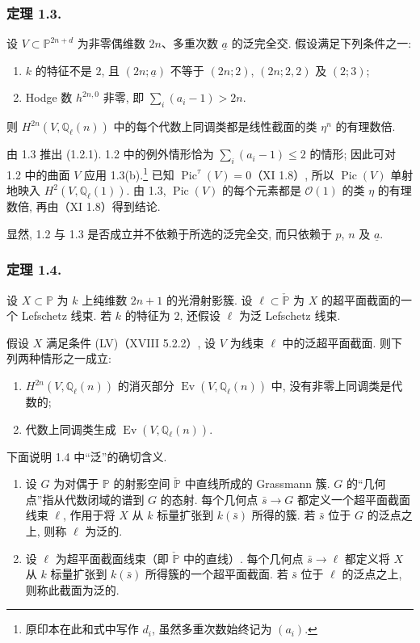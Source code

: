 \subsubsection*{定理 1.3.}
设 $V\subset\mathbb P^{2n+d}$ 为非零偶维数 $2n$、多重次数 $\underline a$ 的泛完全交. 假设满足下列条件之一:
\begin{enumerate}[label=(\alph*)]
\item $k$ 的特征不是 $2$, 且 $(2n;\underline a)$ 不等于 $(2n;2)$, $(2n;2,2)$ 及 $(2;3)$;
\item Hodge 数 $h^{2n,0}$ 非零, 即 $\sum_i(a_i-1)>2n$.
\end{enumerate}
则 $H^{2n}(V,\mathbb Q_\ell(n))$ 中的每个代数上同调类都是线性截面的类 $\eta^n$ 的有理数倍.

由 1.3 推出 (1.2.1). 1.2 中的例外情形恰为 $\sum_i(a_i-1)\leq2$ 的情形; 因此可对 1.2 中的曲面 $V$ 应用 1.3(b).\footnote{原印本在此和式中写作 $d_i$, 虽然多重次数始终记为 $(a_i)$.} 已知 $\operatorname{Pic}^{\tau}(V)=0$（XI 1.8）, 所以 $\operatorname{Pic}(V)$ 单射地映入 $H^2(V,\mathbb Q_\ell(1))$. 由 1.3, $\operatorname{Pic}(V)$ 的每个元素都是 $\mathcal O(1)$ 的类 $\eta$ 的有理数倍, 再由（XI 1.8）得到结论.

显然, 1.2 与 1.3 是否成立并不依赖于所选的泛完全交, 而只依赖于 $p$, $n$ 及 $\underline a$.

\subsubsection*{定理 1.4.}
设 $X\subset\mathbb P$ 为 $k$ 上纯维数 $2n+1$ 的光滑射影簇. 设 $\ell\subset\check{\mathbb P}$ 为 $X$ 的超平面截面的一个 Lefschetz 线束. 若 $k$ 的特征为 $2$, 还假设 $\ell$ 为泛 Lefschetz 线束.

假设 $X$ 满足条件 (LV)（XVIII 5.2.2）, 设 $V$ 为线束 $\ell$ 中的泛超平面截面. 则下列两种情形之一成立:
\begin{enumerate}[label=(\alph*)]
\item $H^{2n}(V,\mathbb Q_\ell(n))$ 的消灭部分 $\operatorname{Ev}(V,\mathbb Q_\ell(n))$ 中, 没有非零上同调类是代数的;
\item 代数上同调类生成 $\operatorname{Ev}(V,\mathbb Q_\ell(n))$.
\end{enumerate}

下面说明 1.4 中“泛”的确切含义.

\begin{enumerate}[label=(\alph*)]
\item 设 $G$ 为对偶于 $\mathbb P$ 的射影空间 $\check{\mathbb P}$ 中直线所成的 Grassmann 簇. $G$ 的“几何点”指从代数闭域的谱到 $G$ 的态射. 每个几何点 $\bar s\to G$ 都定义一个超平面截面线束 $\ell$, 作用于将 $X$ 从 $k$ 标量扩张到 $k(\bar s)$ 所得的簇. 若 $\bar s$ 位于 $G$ 的泛点之上, 则称 $\ell$ 为泛的.
\item 设 $\ell$ 为超平面截面线束（即 $\check{\mathbb P}$ 中的直线）. 每个几何点 $\bar s\to\ell$ 都定义将 $X$ 从 $k$ 标量扩张到 $k(\bar s)$ 所得簇的一个超平面截面. 若 $\bar s$ 位于 $\ell$ 的泛点之上, 则称此截面为泛的.
\end{enumerate}

